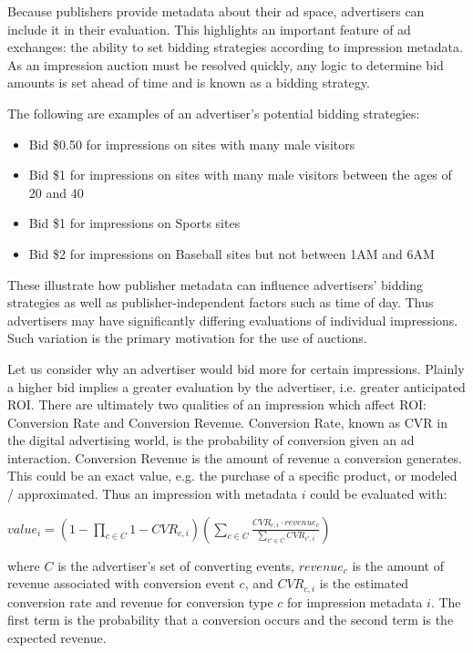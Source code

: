\documentclass{article}
\begin{document}
Because publishers provide metadata about their ad space, advertisers can include it in their evaluation. This highlights an important feature of ad exchanges: the ability to set bidding strategies according to impression metadata. As an impression auction must be resolved quickly, any logic to determine bid amounts is set ahead of time and is known as a bidding strategy.

The following are examples of an advertiser's potential bidding strategies:

\begin{itemize}
\item Bid \$0.50 for impressions on sites with many male visitors
\item Bid \$1 for impressions on sites with many male visitors between the ages of 20 and 40
\item Bid \$1 for impressions on Sports sites
\item Bid \$2 for impressions on Baseball sites but not between 1AM and 6AM
\end{itemize}

These illustrate how publisher metadata can influence advertisers' bidding strategies as well as publisher-independent factors such as time of day. Thus advertisers may have significantly differing evaluations of individual impressions. Such variation is the primary motivation for the use of auctions.

Let us consider why an advertiser would bid more for certain impressions. Plainly a higher bid implies a greater evaluation by the advertiser, i.e. greater anticipated ROI. There are ultimately two qualities of an impression which affect ROI: Conversion Rate and Conversion Revenue. Conversion Rate, known as CVR in the digital advertising world, is the probability of conversion given an ad interaction. Conversion Revenue is the amount of revenue a conversion generates. This could be an exact value, e.g. the purchase of a specific product, or modeled / approximated. Thus an impression with metadata $i$ could be evaluated with:

$ value_{i} = (1-\prod_{c \in C} 1-CVR_{c,i} ) (\sum_{c\in C} \frac{CVR_{c,i} \cdot revenue_{c}}{\sum_{c' \in C} CVR_{c',i}}) $
 
\noindent where $C$ is the advertiser's set of converting events, $revenue_{c}$ is the amount of revenue associated with conversion event $c$, and $CVR_{c,i}$ is the estimated conversion rate and revenue for conversion type $c$ for impression metadata $i$. The first term is the probability that a conversion occurs and the second term is the expected revenue.
\end{document}
